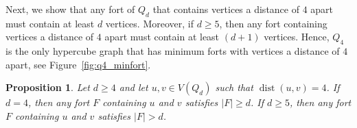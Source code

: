 \documentclass[twoside, 12pt]{article}
\newtheorem{proposition}[theorem]{Proposition}
\theoremstyle{definition}
\newcommand\abs[1]{\left|#1\right|}
\newcommand\dist[2]{\operatorname{dist}\left(#1,#2\right)}
\begin{document}
Next, we show that any fort of $Q_{d}$ that contains vertices a distance of $4$ apart must contain at least $d$ vertices.
Moreover, if $d\geq 5$, then any fort containing vertices a distance of $4$ apart must contain at least $(d+1)$ vertices. 
Hence, $Q_{4}$ is the only hypercube graph that has minimum forts with vertices a distance of $4$ apart, see Figure~\ref{fig:q4_minfort}.
\begin{proposition}\label{prop:max_dist4}
Let $d\geq 4$ and let $u,v\in V(Q_{d})$ such that $\dist{u}{v}=4$.
If $d=4$, then any fort $F$ containing $u$ and $v$ satisfies $\abs{F}\geq d$.
If $d\geq 5$, then any fort $F$ containing $u$ and $v$ satisfies $\abs{F}>d$. 
\end{proposition}
\end{document}
